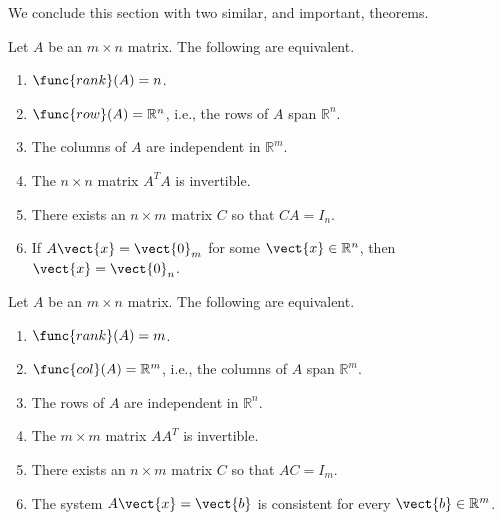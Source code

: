 We conclude this section with two similar, and important, theorems.

\begin{theorem}{}
Let $A$ be an $m\times n$ matrix.
The following are equivalent.
\begin{enumerate}
\item $\func{rank}(A)=n$.
\item $\func{row}(A)=\mathbb{R}^n$, i.e., the rows of $A$ span $\mathbb{R}^n$.
\item The columns of $A$ are independent in $\mathbb{R}^m$.
\item The $n\times n$ matrix $A^TA$ is invertible.
\item There exists an $n\times m$ matrix $C$ so that $CA=I_n$.
\item If $A\vect{x}=\vect{0}_m$ for some $\vect{x}\in\mathbb{R}^n$,
then $\vect{x}=\vect{0}_n$.
\end{enumerate}
\end{theorem}

\begin{theorem}{}
Let $A$ be an $m\times n$ matrix.
The following are equivalent.
\begin{enumerate}
\item $\func{rank}(A)=m$.
\item $\func{col}(A)=\mathbb{R}^m$, i.e., the columns of $A$ span $\mathbb{R}^m$.
\item The rows of $A$ are independent in $\mathbb{R}^n$.
\item The $m\times m$ matrix $AA^T$ is invertible.
\item There exists an $n\times m$ matrix $C$ so that $AC=I_m$.
\item The system $A\vect{x}=\vect{b}$ is consistent for
every $\vect{b}\in\mathbb{R}^m$.
\end{enumerate}
\end{theorem}